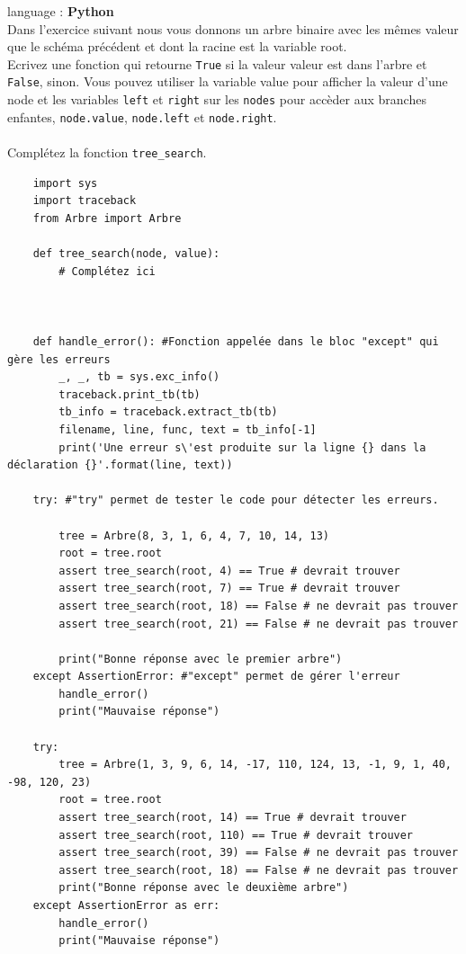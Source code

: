 \begin{Exercice}[15 minutes] language : \textbf{Python}\\
    
    Dans l'exercice suivant nous vous donnons un arbre binaire avec les mêmes valeur que le schéma précédent et dont la racine est la variable root.\\

    Ecrivez une fonction qui retourne \lstinline{True} si la valeur valeur est dans l'arbre et \lstinline{False}, sinon. Vous pouvez utiliser la variable value pour afficher la valeur d'une node et les variables \lstinline{left} et \lstinline{right} sur les \lstinline{nodes} pour accèder aux branches enfantes, \lstinline{node.value}, \lstinline{node.left} et \lstinline{node.right}.\\\\
    Complétez la fonction \lstinline{tree_search}.\\
    \begin{verbatim}
    import sys
    import traceback
    from Arbre import Arbre
    
    def tree_search(node, value):
        # Complétez ici
        
    
    
    def handle_error(): #Fonction appelée dans le bloc "except" qui gère les erreurs
        _, _, tb = sys.exc_info()
        traceback.print_tb(tb) 
        tb_info = traceback.extract_tb(tb)
        filename, line, func, text = tb_info[-1]
        print('Une erreur s\'est produite sur la ligne {} dans la déclaration {}'.format(line, text))
    
    try: #"try" permet de tester le code pour détecter les erreurs.
    
        tree = Arbre(8, 3, 1, 6, 4, 7, 10, 14, 13)
        root = tree.root
        assert tree_search(root, 4) == True # devrait trouver
        assert tree_search(root, 7) == True # devrait trouver
        assert tree_search(root, 18) == False # ne devrait pas trouver
        assert tree_search(root, 21) == False # ne devrait pas trouver
    
        print("Bonne réponse avec le premier arbre")
    except AssertionError: #"except" permet de gérer l'erreur
        handle_error()
        print("Mauvaise réponse")
        
    try:
        tree = Arbre(1, 3, 9, 6, 14, -17, 110, 124, 13, -1, 9, 1, 40, -98, 120, 23)
        root = tree.root
        assert tree_search(root, 14) == True # devrait trouver
        assert tree_search(root, 110) == True # devrait trouver
        assert tree_search(root, 39) == False # ne devrait pas trouver
        assert tree_search(root, 18) == False # ne devrait pas trouver
        print("Bonne réponse avec le deuxième arbre")
    except AssertionError as err:
        handle_error()
        print("Mauvaise réponse")


\end{verbatim}
\end{Exercice}
